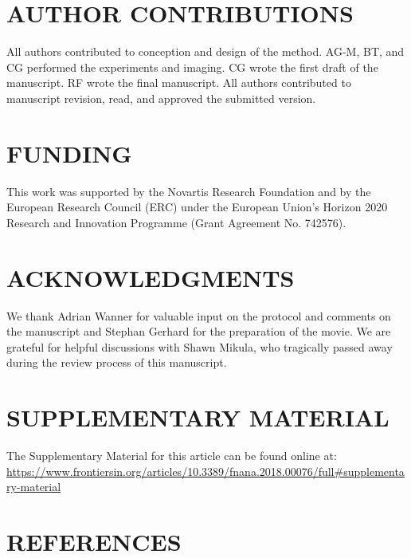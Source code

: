 \documentclass{article}
\begin{document}
\section*{AUTHOR CONTRIBUTIONS}

All authors contributed to conception and design of the method. AG-M, BT, and CG performed the experiments and imaging. CG wrote the first draft of the manuscript. RF wrote the final manuscript. All authors contributed to manuscript revision, read, and approved the submitted version.

\section*{FUNDING}

This work was supported by the Novartis Research Foundation and by the European Research Council (ERC) under the European Union’s Horizon 2020 Research and Innovation Programme (Grant Agreement No. 742576).

\section*{ACKNOWLEDGMENTS}

We thank Adrian Wanner for valuable input on the protocol and comments on the manuscript and Stephan Gerhard for the preparation of the movie. We are grateful for helpful discussions with Shawn Mikula, who tragically passed away during the review process of this manuscript.

\section*{SUPPLEMENTARY MATERIAL}

The Supplementary Material for this article can be found online at: \url{https://www.frontiersin.org/articles/10.3389/fnana.2018.00076/full#supplementary-material}


\section*{REFERENCES}
\end{document}
